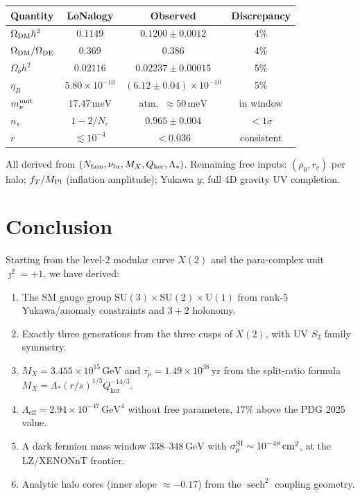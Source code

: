 \documentclass[12pt]{article}
\theoremstyle{plain}
\theoremstyle{definition}
\numberwithin{equation}{section}
\newcommand{\br}{\mathrm{br}}
\newcommand{\kker}{\mathrm{ker}}
\newcommand{\eff}{\mathrm{eff}}
\DeclareMathOperator{\sech}{sech}
\begin{document}
\begin{center}
\begin{tabular}{lccc}
\toprule
Quantity & LoNalogy & Observed & Discrepancy\\
\midrule
$\Omega_{\rm DM}h^2$ & $0.1149$ & $0.1200\pm0.0012$ & $4\%$\\
$\Omega_{\rm DM}/\Omega_{\rm DE}$ & $0.369$ & $0.386$ & $4\%$\\
$\Omega_b h^2$ & $0.02116$ & $0.02237\pm0.00015$ & $5\%$\\
$\eta_B$ & $5.80\times10^{-10}$ & $(6.12\pm0.04)\times10^{-10}$ & $5\%$\\
$m_\nu^{\rm unit}$ & $17.47\,\mathrm{meV}$ & atm.\ $\approx50\,\mathrm{meV}$ & in window\\
$n_s$ & $1-2/N_e$ & $0.965\pm0.004$ & $<1\sigma$\\
$r$ & $\lesssim10^{-4}$ & $<0.036$ & consistent\\
\bottomrule
\end{tabular}
\end{center}

All derived from $(N_{\rm fam},\nu_\br,M_X,Q_{\kker},\Lambda_*)$. Remaining free inputs: $(\rho_0,r_c)$ per halo; $f_T/M_{\rm Pl}$ (inflation amplitude); Yukawa $y$; full 4D gravity UV completion.


\section*{Conclusion}


Starting from the level-2 modular curve $X(2)$ and the para-complex unit
$\jmath^2=+1$, we have derived:

\begin{enumerate}
\item The SM gauge group $\mathrm{SU}(3)\times\mathrm{SU}(2)\times\mathrm{U}(1)$
  from rank-5 Yukawa/anomaly constraints and $3+2$ holonomy.
\item Exactly three generations from the three cusps of $X(2)$,
  with UV $S_3$ family symmetry.
\item $M_X=3.455\times10^{15}\,\mathrm{GeV}$ and $\tau_p=1.49\times10^{38}\,\mathrm{yr}$
  from the split-ratio formula $M_X=\Lambda_*(r/s)^{1/3}Q_{\ker}^{-14/3}$.
\item $\Lambda_\eff=2.94\times10^{-47}\,\mathrm{GeV}^4$ without free parameters,
  17\% above the PDG 2025 value.
\item A dark fermion mass window $338$--$348\,\mathrm{GeV}$ with
  $\sigma_p^{\rm SI}\sim10^{-48}\,\mathrm{cm}^2$, at the LZ/XENONnT frontier.
\item Analytic halo cores (inner slope $\approx-0.17$) from the $\sech^2$
  coupling geometry.
\end{enumerate}
\end{document}
